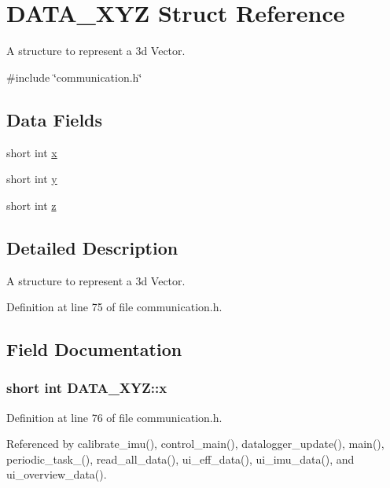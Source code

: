 \hypertarget{structDATA__XYZ}{\section{D\-A\-T\-A\-\_\-\-X\-Y\-Z Struct Reference}
\label{structDATA__XYZ}
}


A structure to represent a 3d Vector.  




{\ttfamily \#include \char`\"{}communication.\-h\char`\"{}}

\subsection*{Data Fields}
\begin{DoxyCompactItemize}
\item 
short int \hyperlink{structDATA__XYZ_a54c1596e9f9969fd9c21e8458024ecfb}{x}
\item 
short int \hyperlink{structDATA__XYZ_a94bbb1c889bf53eb6a5fffa2b39322cf}{y}
\item 
short int \hyperlink{structDATA__XYZ_a69e89ab0ec6e5d72fc5d54f62cc07fb5}{z}
\end{DoxyCompactItemize}


\subsection{Detailed Description}
A structure to represent a 3d Vector. 

Definition at line 75 of file communication.\-h.



\subsection{Field Documentation}
\hypertarget{structDATA__XYZ_a54c1596e9f9969fd9c21e8458024ecfb}{
\subsubsection[{x}]{\setlength{\rightskip}{0pt plus 5cm}short int D\-A\-T\-A\-\_\-\-X\-Y\-Z\-::x}}\label{structDATA__XYZ_a54c1596e9f9969fd9c21e8458024ecfb}


Definition at line 76 of file communication.\-h.



Referenced by calibrate\-\_\-imu(), control\-\_\-main(), datalogger\-\_\-update(), main(), periodic\-\_\-task\-\_(), read\-\_\-all\-\_\-data(), ui\-\_\-eff\-\_\-data(), ui\-\_\-imu\-\_\-data(), and ui\-\_\-overview\-\_\-data().

